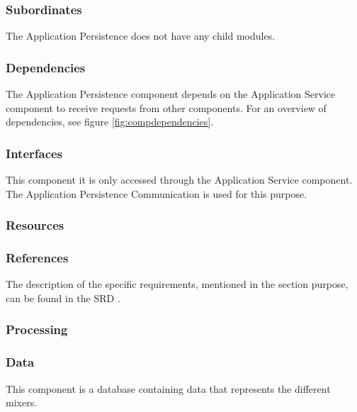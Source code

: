\subsubsection*{Subordinates}
The Application Persistence does not have any child modules.

\subsubsection*{Dependencies}
The Application Persistence component depends on the Application Service component to receive requests from other components. For an overview of dependencies, see figure \ref{fig:compdependencies}.

\subsubsection*{Interfaces}
This component it is only accessed through the Application Service component. The Application Persistence Communication is used for this purpose.  

\subsubsection*{Resources}

\subsubsection*{References}
The description of the specific requirements, mentioned in the section purpose, can be found in the SRD \cite{srd}.

\subsubsection*{Processing}

\subsubsection*{Data}
This component is a database containing data that represents the different mixers.

